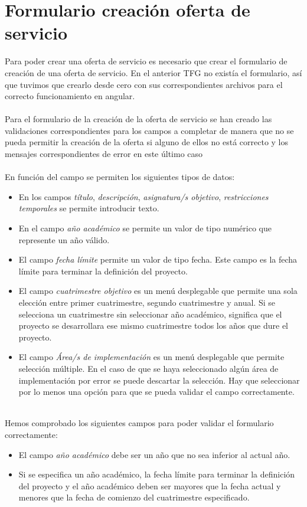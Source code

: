 \documentclass[11pt]{book}
\begin{document}
	\section{Formulario creación oferta de servicio}
	Para poder crear una oferta de servicio es necesario que crear el formulario de creación de una oferta de servicio. En el anterior TFG no existía el formulario, así que tuvimos que crearlo desde cero con sus correspondientes archivos para el correcto funcionamiento en angular.\\\\
	Para el formulario de la creación de la oferta de servicio se han creado las validaciones correspondientes para los campos a completar de manera que no se pueda permitir la creación de la oferta si alguno de ellos no está correcto y los mensajes correspondientes de error en este último caso\\\\
	En función del campo se permiten los siguientes tipos de datos: \\
	\begin{itemize} 
		\item En los campos \emph{título}, \emph{descripción}, \emph{asignatura/s objetivo}, \emph{restricciones temporales} se permite introducir texto.
		\item En el campo \emph{año académico} se permite un valor de tipo numérico que represente un año válido.
		\item El campo \emph{fecha límite} permite un valor de tipo fecha. Este campo es la fecha límite para terminar la definición del proyecto.
		\item  El campo \emph{cuatrimestre objetivo} es un menú desplegable que permite una sola elección entre primer cuatrimestre, segundo cuatrimestre y anual. Si se selecciona un cuatrimestre sin seleccionar año académico, significa que el proyecto se desarrollara ese mismo cuatrimestre todos los años que dure el proyecto.
		\item El campo \emph{Área/s de implementación} es un menú desplegable que permite selección múltiple. En el caso de que se haya seleccionado algún área de implementación por error se puede descartar la selección. Hay que seleccionar por lo menos una opción para que se pueda validar el campo correctamente.\\\\
	\end{itemize}
	Hemos comprobado los siguientes campos para poder validar el formulario correctamente:
	\begin{itemize} 
		\item	El campo \emph{año académico} debe ser un año que no sea inferior al actual año.
		\item	Si se especifica un año académico, la fecha límite para terminar la definición del proyecto y el año académico deben ser mayores que la fecha actual y menores que la fecha de comienzo del cuatrimestre especificado.\\\\
	\end{itemize}
	
\end{document}

